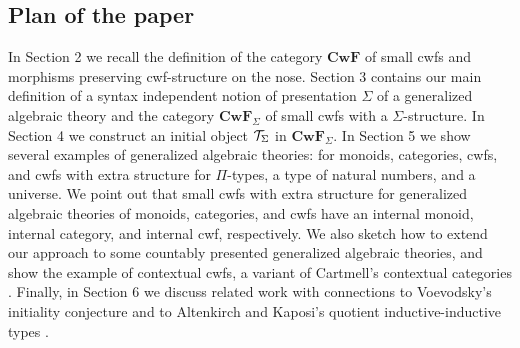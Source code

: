\documentclass{mscs}
\newcommand{\FYI}[1]{{#1}}
\def\V{\mathrm{V}}
\def\Cwf{\mathbf{CwF}}
\begin{document}


\subsection*{Plan of the paper}

In Section 2 we recall the definition of the category $\Cwf$ of small cwfs and morphisms preserving cwf-structure on the nose. Section 3 contains our main definition of a syntax independent notion of \FYI{presentation} $\Sigma$ of a generalized algebraic theory and the category $\Cwf_\Sigma$ of small cwfs with a $\Sigma$-structure. In Section 4 we construct an initial object ${\mathcal T}_\Sigma$ in $\Cwf_\Sigma$. In Section 5 we show several examples of generalized algebraic theories: for monoids, categories, cwfs, and cwfs with extra structure for $\Pi$-types, a type of natural numbers, and a universe. We point out that small cwfs with extra structure for generalized algebraic theories of monoids, categories, and cwfs have an internal monoid, internal category, and internal cwf, respectively. We also sketch how to extend our approach to some countably presented generalized algebraic theories, and show the example of contextual cwfs, a variant of Cartmell's contextual categories \cite{cartmell:phd,cartmell:apal}. Finally, in Section 6 we discuss related work with connections to Voevodsky's initiality conjecture \cite{voevodsky:initiality} and to Altenkirch and Kaposi's quotient inductive-inductive types \cite{altenkirch:qiits}.

\end{document}
